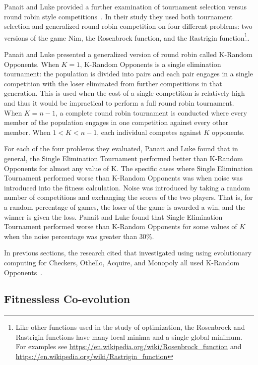 Panait and Luke provided a further examination of tournament selection versus
round robin style competitions~\cite{Panait02acomparative}. In their study they
used both tournament selection and generalized round robin competition on four
different problems: two versions of the game Nim, the Rosenbrock function, and
the Rastrigin function\footnote{Like other functions used in the study of
optimization, the Rosenbrock and Rastrigin functions have many local minima and
a single global minimum. For examples see
\url{https://en.wikipedia.org/wiki/Rosenbrock_function} and
\url{https://en.wikipedia.org/wiki/Rastrigin_function}}.

Panait and Luke presented a generalized version of round robin called K-Random
Opponents. When \(K=1\), K-Random Opponents is a single elimination tournament:
the population is divided into pairs and each pair engages in a single
competition with the loser eliminated from further competitions in that
generation. This is used when the cost of a single competition is relatively
high and thus it would be impractical to perform a full round robin tournament.
When \(K=n-1\), a complete round robin tournament is conducted where every
member of the population engages in one competition against every other member.
When \(1 < K < n-1\), each individual competes against \(K\) opponents.

For each of the four problems they evaluated, Panait and Luke found that in
general, the Single Elimination Tournament performed better than K-Random
Opponents for almost any value of K. The specific cases where Single Elimination
Tournament performed worse than K-Random Opponents was when noise was introduced
into the fitness calculation. Noise was introduced by taking a random number of
competitions and exchanging the scores of the two players. That is, for a random
percentage of games, the loser of the game is awarded a win, and the winner is
given the loss. Panait and Luke found that Single Elimination Tournament
performed worse than K-Random Opponents for some values of \(K\) when the noise
percentage was greater than 30\%.

In previous sections, the research cited that investigated using using
evolutionary computing for Checkers, Othello, Acquire, and Monopoly all used
K-Random
Opponents~\cite{Fogel2000Anaconda,journals/tec/ChellapillaF01,ChongTW05,Anthony2002,DBLP:conf/cig/Frayn05}.

\subsection{Fitnessless Co-evolution}

